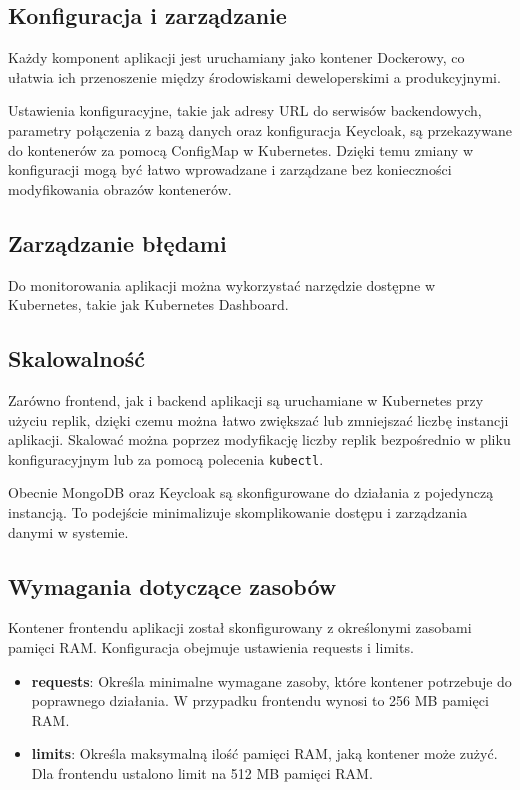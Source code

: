 \documentclass[12pt,a4paper]{article}
\begin{document}
\subsection{Konfiguracja i zarządzanie}
\label{sec:NonFunctionalConditions}
Każdy komponent aplikacji jest uruchamiany jako kontener Dockerowy, co ułatwia ich przenoszenie między środowiskami deweloperskimi a produkcyjnymi.

Ustawienia konfiguracyjne, takie jak adresy URL do serwisów backendowych, parametry połączenia z bazą danych oraz konfiguracja Keycloak, są przekazywane do kontenerów za pomocą ConfigMap w Kubernetes. Dzięki temu zmiany w konfiguracji mogą być łatwo wprowadzane i zarządzane bez konieczności modyfikowania obrazów kontenerów.

\subsection{Zarządzanie błędami}
\label{sec:ERD} 
Do monitorowania aplikacji można wykorzystać narzędzie dostępne w Kubernetes, takie jak Kubernetes Dashboard.

\subsection{Skalowalność}
\label{sec:ExamplesSection}
Zarówno frontend, jak i backend aplikacji są uruchamiane w Kubernetes przy użyciu replik, dzięki czemu można łatwo zwiększać lub zmniejszać liczbę instancji aplikacji. Skalować można poprzez modyfikację liczby replik bezpośrednio w pliku konfiguracyjnym lub za pomocą polecenia \texttt{kubectl}.

Obecnie MongoDB oraz Keycloak są skonfigurowane do działania z pojedynczą instancją. To podejście minimalizuje skomplikowanie dostępu i zarządzania danymi w systemie.

\subsection{Wymagania dotyczące zasobów}
\label{sec:ExampleTables}
Kontener frontendu aplikacji został skonfigurowany z określonymi zasobami pamięci RAM. Konfiguracja obejmuje ustawienia requests i limits.

\begin{itemize}
    \item\textbf{requests}: Określa minimalne wymagane zasoby, które kontener potrzebuje do poprawnego działania. W przypadku frontendu wynosi to 256 MB pamięci RAM.
    
    \item\textbf{limits}: Określa maksymalną ilość pamięci RAM, jaką kontener może zużyć. Dla frontendu ustalono limit na 512 MB pamięci RAM.
\end{itemize}
\end{document}
